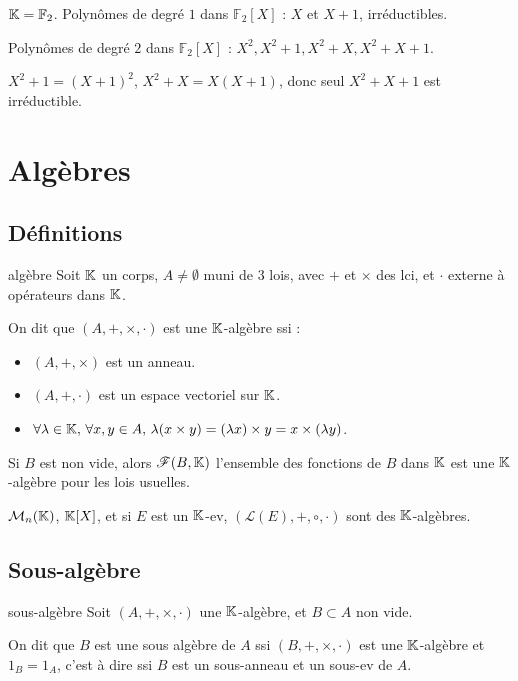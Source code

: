 \begin{exemple}
    $\mathbb{K} = \mathbb F_2$. Polynômes de degré $1$ dans $\mathbb F_2[X]$ : $X$ et $X + 1$, irréductibles.

    Polynômes de degré $2$ dans $\mathbb F_2[X]$ : $X^2, X^2 + 1, X^2 + X, X^2 + X + 1$.

    $X^2 + 1 = (X + 1)^2$, $X^2 + X = X(X + 1)$, donc seul $X^2 + X + 1$ est irréductible.
\end{exemple}

\section{Algèbres} 
\subsection{Définitions}

\begin{definition}{algèbre}{}
    Soit $\mathbb{K}$ un corps, $A \neq \emptyset$ muni de 3 lois, avec $+$ et $\times$ des lci, 
    et $\cdot$ externe à opérateurs dans $\mathbb{K}$.

    On dit que $(A, +, \times, \cdot)$ est une $\mathbb{K}$-algèbre ssi :
    \begin{itemize}
        \item $(A, +, \times)$ est un anneau.
        \item $(A, +, \cdot)$ est un espace vectoriel sur $\mathbb{K}$.
        \item $\forall \lambda \in \mathbb{K}, \, \forall x, y \in A, \, \lambda (x \times y) = (\lambda x) \times y = x \times (\lambda y)$.
    \end{itemize}

\end{definition}

\begin{exemple}
    Si $B$ est non vide, alors $\mathscr F(B, \mathbb{K})$ l'ensemble des fonctions de $B$ dans $\mathbb{K}$ est une $\mathbb{K}$-algèbre
    pour les lois usuelles.

    $\mathcal M_n(\mathbb{K})$, $\mathbb{K}[X]$, et si $E$ est un $\mathbb{K}$-ev, $(\mathcal L(E), +, \circ, \cdot)$ sont des $\mathbb{K}$-algèbres.
\end{exemple}

\subsection{Sous-algèbre}

\begin{definition}{sous-algèbre}{}
    Soit $(A, +, \times, \cdot)$ une $\mathbb{K}$-algèbre, et $B \subset A$ non vide. 

    On dit que $B$ est une sous algèbre de $A$ ssi $(B, +, \times, \cdot)$ est une $\mathbb{K}$-algèbre 
    et $1_B = 1_A$, c'est à dire ssi $B$ est un sous-anneau et un sous-ev de $A$.
\end{definition}

